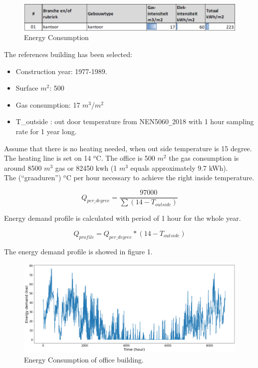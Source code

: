 \documentclass[a4paper,10pt]{article}
\begin{document}
\begin{figure}[ht]
\centering
\includegraphics[width=1\columnwidth]{pictures/ECN.png}
\caption[Short title]{Energy Consumption}
\label{fig:ff1}\end{figure}


The references building has been selected:

    \begin{itemize}
      \item Construction year: 1977-1989.
      \item Surface $m^2$: 500
      \item Gas consumption: 17 $m^3$/$m^2$
      \item T{\_outside} : out door temperature from NEN5060\texttt{\_}2018 with 1 hour sampling rate for 1 year long.
    \end{itemize}
Assume that there is no heating needed, when out side temperature is 15 degree. The heating line is set on 14 $^o$C.
The office is 500 $m^2$ the gas consumption is around 8500  $m^3$ gas or 82450 kwh (1 $m^3$ equals approximately 9.7 kWh).\\
The (“graaduren”) $^o$C per hour necessary to achieve the right inside temperature.



\begin{equation}
Q_{per{\_}degree}=\frac{97000}{\sum(14 - T_{outside})}
\end{equation}

Energy demand profile is calculated with period of 1 hour for the whole year.

\begin{equation}
Q_{profile}=Q_{per{\_}degree}*{(14 - T_{outside})}
\end{equation}

The energy demand profile is showed in figure 1.

\begin{figure}[H]
\centering
\includegraphics[width=1\columnwidth]{pictures/Q_profile.png}
\caption[Short title]{Energy Consumption of office building.}
\label{fig:ff2}\end{figure}
\end{document}
